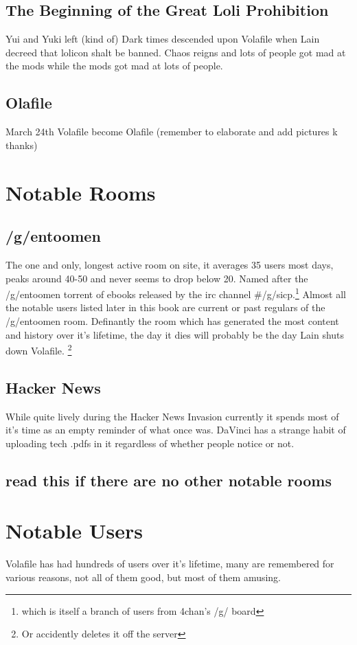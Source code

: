 \documentclass[12pt]{report}
\begin{document}
{\section{The Beginning of the Great Loli Prohibition}
Yui and Yuki left (kind of) Dark times descended upon Volafile when Lain
decreed that lolicon shalt be banned. Chaos reigns and lots of people got
mad at the mods while the mods got mad at lots of people.
\vfill
\pagebreak



\section{Olafile}
March 24th Volafile become Olafile (remember to elaborate and add pictures k thanks)

\chapter{Notable Rooms}

\section{/g/entoomen}
	The one and only, longest active room on site, it averages 35 users most days, peaks around 40-50 and never seems to drop below 20. Named after the /g/entoomen torrent of ebooks released by the irc channel {\#}/g/sicp.\footnote{which is itself a branch of users from 4chan's /g/ board}
	 Almost all the notable users listed later in this book are current or past regulars of the /g/entoomen room. Definantly the room which has generated the most content and history over it's lifetime, the day it dies will probably be the day Lain shuts down Volafile. \footnote{Or accidently deletes it off the server}

\section{Hacker News}
	While quite lively during the Hacker News Invasion currently it spends most of it's time as an empty reminder of what once was. DaVinci has a strange habit of uploading tech .pdfs in it regardless of whether people notice or not.
	
\section{read this if there are no other notable rooms}


\chapter{Notable Users}
	Volafile has had hundreds of users over it's lifetime, many are remembered for various reasons, not all of them good, but most of them amusing.

}
\end{document}
